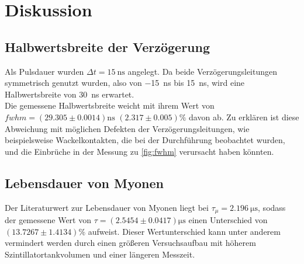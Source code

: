 \newpage
\section{Diskussion}
\label{sec:diskussion}

\subsection{Halbwertsbreite der Verzögerung}
Als Pulsdauer wurden $\Delta t = \SI{15}{\nano\second}$ angelegt.
Da beide Verzögerungsleitungen symmetrisch genutzt wurden, also von \SI{-15}{\nano\second} bis \SI{15}{\nano\second}, wird eine Halbwertsbreite von \SI{30}{\nano\second} erwartet.\\
Die gemessene Halbwertsbreite weicht mit ihrem Wert von $fwhm = \left(29.305\pm0.0014\right)\si{\nano\second}$ $\left(2.317\pm0.005\right)\%$ davon ab.
Zu erklären ist diese Abweichung mit möglichen Defekten der Verzögerungsleitungen, wie beispielsweise Wackelkontakten, die bei der Durchführung beobachtet wurden, und die Einbrüche in der Messung zu \autoref{fig:fwhm} verursacht haben könnten.

\subsection{Lebensdauer von Myonen}
Der Literaturwert zur Lebensdauer von Myonen liegt bei $\tau_{\mu} = \SI{2.196}{\micro\second}$, sodass der gemessene Wert von $\tau = \left(2.5454 \pm 0.0417\right)\si{\micro\second}$ einen Unterschied von $\left(13.7267\pm1.4134\right)\%$ aufweist.
Dieser Wertunterschied kann unter anderem vermindert werden durch einen größeren Versuchsaufbau mit höherem Szintillatortankvolumen und einer längeren Messzeit.
